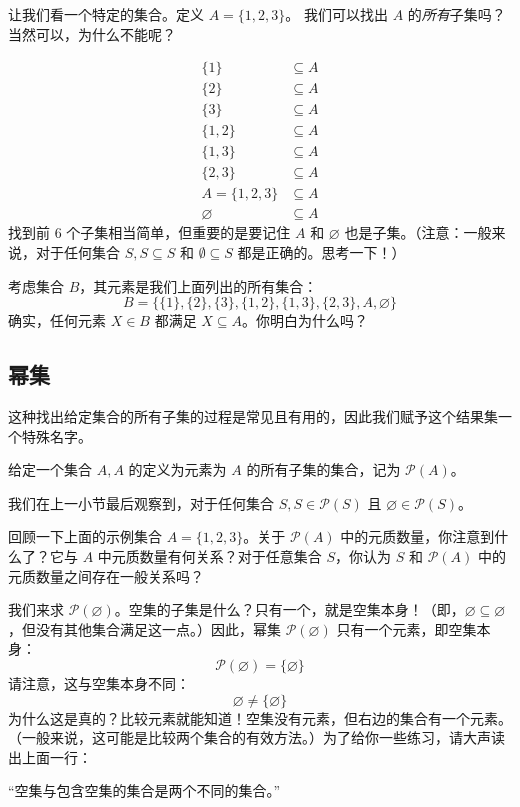 让我们看一个特定的集合。定义 $A = \{1, 2, 3\}$。 我们可以找出 $A$ 的\emph{所有}子集吗？当然可以，为什么不能呢？

\begin{align*}
    \{1\} &\subseteq A \\
    \{2\} &\subseteq A \\
    \{3\} &\subseteq A \\
    \{1,2\} &\subseteq A \\
    \{1,3\} &\subseteq A \\
    \{2,3\} &\subseteq A \\
    A = \{1, 2,3\} &\subseteq A \\
    \varnothing &\subseteq A
\end{align*}
找到前 6 个子集相当简单，但重要的是要记住 $A$ 和 $\varnothing$ 也是子集。（注意：一般来说，对于任何集合 $S, S \subseteq S$ 和 $∅ \subseteq S$ 都是正确的。思考一下！）

考虑集合 $B$，其元素是我们上面列出的所有集合：
\[B = \{\{1\}, \{2\}, \{3\}, \{1, 2\}, \{1, 3\}, \{2, 3\}, A, \varnothing\}\]
确实，任何元素 $X \in B$ 都满足 $X \subseteq A$。你明白为什么吗？

\subsection{幂集}

这种找出给定集合的所有子集的过程是常见且有用的，因此我们赋予这个结果集一个特殊名字。

\begin{definition}
    给定一个集合 $A, A$ 的定义为元素为 $A$ 的所有子集的集合，记为 $\mathcal{P}(A)$。
\end{definition}

我们在上一小节最后观察到，对于任何集合 $S, S \in \mathcal{P}(S)$ 且 $\varnothing \in \mathcal{P}(S)$。

回顾一下上面的示例集合 $A = \{1, 2, 3\}$。关于 $\mathcal{P}(A)$ 中的元质数量，你注意到什么了？它与 $A$ 中元质数量有何关系？对于任意集合 $S$，你认为 $S$ 和 $\mathcal{P}(A)$ 中的元质数量之间存在一般关系吗？

\begin{example}
    我们来求 $\mathcal{P}(\varnothing)$。空集的子集是什么？只有一个，就是空集本身！（即，$\varnothing \subseteq \varnothing$，但没有其他集合满足这一点。）因此，幂集 $\mathcal{P}(\varnothing)$ 只有一个元素，即空集本身：
    \[\mathcal{P}(\varnothing) = \{ \varnothing \}\]
    请注意，这与空集本身不同：
    \[\varnothing \ne \{ \varnothing \}\]
    为什么这是真的？比较元素就能知道！空集没有元素，但右边的集合有一个元素。（一般来说，这可能是比较两个集合的有效方法。）为了给你一些练习，请大声读出上面一行：
    \begin{center}
        ``空集与包含空集的集合是两个不同的集合。''
    \end{center}
\end{example}

